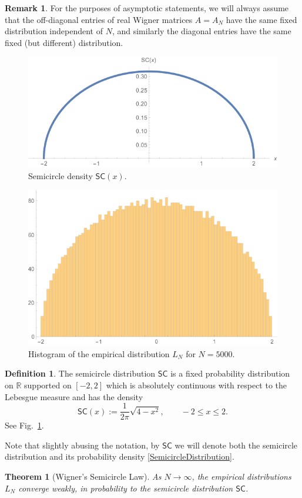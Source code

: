 \documentclass[letterpaper,11pt,oneside,reqno]{amsart}
\numberwithin{equation}{section}
\newcommand{\SC}{\mathsf{SC}}
\newtheorem{theorem}[proposition]{Theorem}
\theoremstyle{definition}
\newtheorem{definition}[proposition]{Definition}
\newtheorem{remark}[proposition]{Remark}
\begin{document}
\begin{remark}
	For the purposes of asymptotic statements, we will always assume that the 
	off-diagonal entries of real Wigner matrices 
	$A=A_N$ have the same fixed distribution independent of $N$,
	and similarly the diagonal entries 
	have the same fixed (but different) distribution.
\end{remark}

\begin{figure}[htbp]
	\includegraphics[width=.5\textwidth]{img/SC.png}
	\caption{Semicircle density $\SC(x)$.}
	\label{fig:semicircle}
\end{figure}

\begin{figure}[htbp]
	\includegraphics[width=.5\textwidth]{img/Wigner1.png}
	\caption{Histogram of the empirical distribution 
	$L_N$ for $N=5000$.}
	\label{fig:Wigner}
\end{figure}

\begin{definition}
	The semicircle distribution $\SC$ is 
	a fixed probability distribution on $\mathbb{R}$
	supported on $[-2,2]$
	which is absolutely continuous with respect to the
	Lebesgue measure and has the density
	\begin{equation}\label{SemicircleDistribution}
		\SC(x):=\frac{1}{2\pi}\sqrt{4-x^2}, \qquad -2\leq x\leq 2.
	\end{equation}
	See Fig.~\ref{fig:semicircle}.

	Note that slightly abusing the notation, by $\SC$ we will denote both the
	semicircle distribution and its probability density \eqref{SemicircleDistribution}.
\end{definition}

\begin{theorem}[Wigner's Semicircle Law]\label{thm:SemicircleLaw}
	As $N\to\infty$,
	the empirical distributions 
	$L_N$ converge weakly, in probability to the 
	semicircle distribution $\SC$.
\end{theorem}
\end{document}
